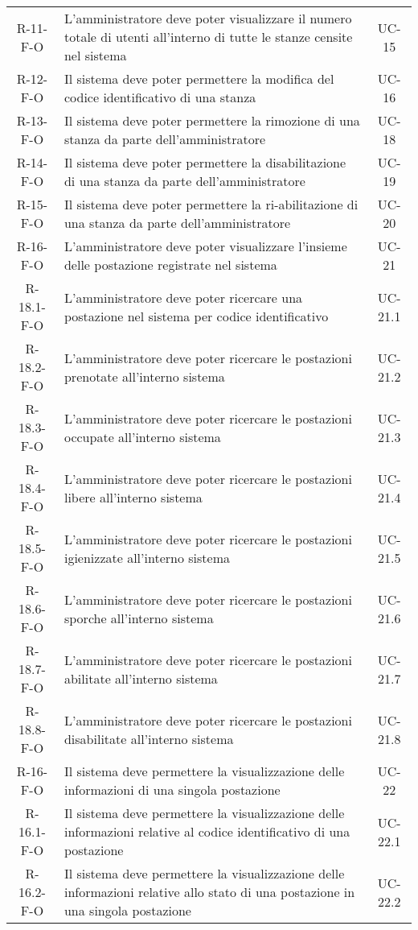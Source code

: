 \begin{longtable}{ c C{9cm} c }
    R-11-F-O &  L'amministratore deve poter visualizzare il numero totale di utenti all'interno di tutte le stanze censite nel sistema& UC- 15\\
    R-12-F-O &  Il sistema deve poter permettere la modifica del codice identificativo di una stanza& UC- 16\\
    R-13-F-O &  Il sistema deve poter permettere la rimozione di una stanza da parte dell'amministratore& UC- 18\\
    R-14-F-O &  Il sistema deve poter permettere la disabilitazione di una stanza da parte dell'amministratore& UC- 19\\
    R-15-F-O &  Il sistema deve poter permettere la ri-abilitazione di una stanza da parte dell'amministratore& UC- 20\\
    R-16-F-O & L'amministratore deve poter visualizzare l'insieme delle postazione registrate nel sistema& UC- 21\\
    R-18.1-F-O & L'amministratore deve poter ricercare una postazione nel sistema per codice identificativo& UC- 21.1\\
    R-18.2-F-O & L'amministratore deve poter ricercare le postazioni prenotate all'interno sistema& UC- 21.2\\
    R-18.3-F-O & L'amministratore deve poter ricercare le postazioni occupate all'interno sistema& UC- 21.3\\
    R-18.4-F-O & L'amministratore deve poter ricercare le postazioni libere all'interno sistema& UC- 21.4\\
    R-18.5-F-O & L'amministratore deve poter ricercare le postazioni igienizzate all'interno sistema& UC- 21.5\\
    R-18.6-F-O & L'amministratore deve poter ricercare le postazioni sporche all'interno sistema& UC- 21.6\\
    R-18.7-F-O & L'amministratore deve poter ricercare le postazioni abilitate all'interno sistema& UC- 21.7\\
    R-18.8-F-O & L'amministratore deve poter ricercare le postazioni disabilitate all'interno sistema& UC- 21.8\\
    R-16-F-O & Il sistema deve permettere la visualizzazione delle informazioni di una singola postazione& UC- 22\\
    R-16.1-F-O & Il sistema deve permettere la visualizzazione delle informazioni relative al codice identificativo di una postazione & UC- 22.1\\
    R-16.2-F-O & Il sistema deve permettere la visualizzazione delle informazioni relative allo stato di una postazione in una singola postazione& UC- 22.2\\

\end{longtable}

